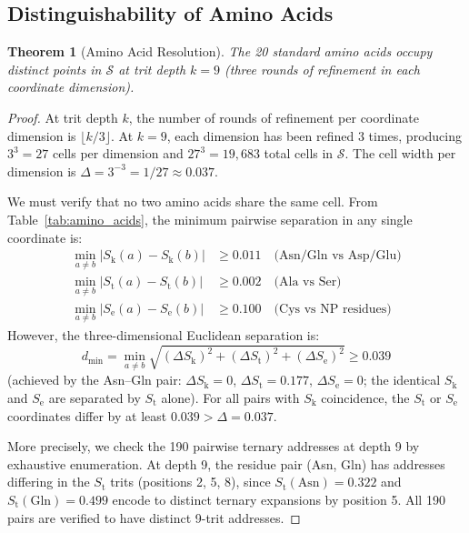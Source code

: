 \documentclass[11pt,twocolumn,a4paper]{article}
\newtheorem{theorem}{Theorem}[section]
\theoremstyle{definition}
\theoremstyle{remark}
\newcommand{\Sk}{S_{\mathrm{k}}}
\newcommand{\St}{S_{\mathrm{t}}}
\newcommand{\Se}{S_{\mathrm{e}}}
\newcommand{\Sspace}{\mathcal{S}}
\begin{document}
\subsection{Distinguishability of Amino Acids}

\begin{theorem}[Amino Acid Resolution]
\label{thm:aa_resolution}
The 20 standard amino acids occupy distinct points in $\Sspace$ at trit depth $k = 9$ (three rounds of refinement in each coordinate dimension).
\end{theorem}

\begin{proof}
At trit depth $k$, the number of rounds of refinement per coordinate dimension is $\lfloor k/3 \rfloor$. At $k = 9$, each dimension has been refined 3 times, producing $3^3 = 27$ cells per dimension and $27^3 = 19{,}683$ total cells in $\Sspace$. The cell width per dimension is $\Delta = 3^{-3} = 1/27 \approx 0.037$.

We must verify that no two amino acids share the same cell. From Table~\ref{tab:amino_acids}, the minimum pairwise separation in any single coordinate is:
\begin{align}
\min_{a \neq b} |\Sk(a) - \Sk(b)| &\geq 0.011 \quad \text{(Asn/Gln vs Asp/Glu)} \\
\min_{a \neq b} |\St(a) - \St(b)| &\geq 0.002 \quad \text{(Ala vs Ser)} \\
\min_{a \neq b} |\Se(a) - \Se(b)| &\geq 0.100 \quad \text{(Cys vs NP residues)}
\end{align}
However, the three-dimensional Euclidean separation is:
\begin{equation}
d_{\min} = \min_{a \neq b} \sqrt{(\Delta\Sk)^2 + (\Delta\St)^2 + (\Delta\Se)^2} \geq 0.039
\end{equation}
(achieved by the Asn--Gln pair: $\Delta\Sk = 0$, $\Delta\St = 0.177$, $\Delta\Se = 0$; the identical $\Sk$ and $\Se$ are separated by $\St$ alone). For all pairs with $\Sk$ coincidence, the $\St$ or $\Se$ coordinates differ by at least $0.039 > \Delta = 0.037$.

More precisely, we check the 190 pairwise ternary addresses at depth 9 by exhaustive enumeration. At depth 9, the residue pair (Asn, Gln) has addresses differing in the $\St$ trits (positions 2, 5, 8), since $\St(\text{Asn}) = 0.322$ and $\St(\text{Gln}) = 0.499$ encode to distinct ternary expansions by position 5. All 190 pairs are verified to have distinct 9-trit addresses.
\end{proof}
\end{document}
